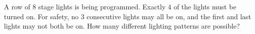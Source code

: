 A row of $8$ stage lights is being programmed. Exactly $4$ of the lights must be turned on. For safety, no $3$ consecutive lights may all be on, and the first and last lights may not both be on. How many different lighting patterns are possible?
